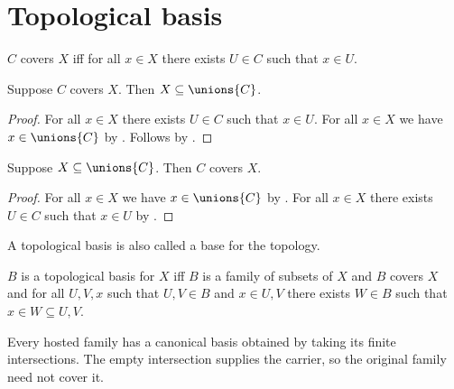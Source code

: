 






\section{Topological basis}\label{form_sec_topobasis}

\begin{abbreviation}\label{covers}
    $C$ covers $X$ iff
    for all $x\in X$ there exists $U\in C$ such that $x\in U$.
\end{abbreviation}

\begin{proposition}\label{covers_unions_intro}
    Suppose $C$ covers $X$.
    Then $X\subseteq\unions{C}$.
\end{proposition}
\begin{proof}
    For all $x\in X$ there exists $U\in C$ such that $x\in U$.
    For all $x\in X$ we have $x\in\unions{C}$ by .
    Follows by .
\end{proof}

\begin{proposition}\label{covers_unions_elim}
    Suppose $X\subseteq\unions{C}$.
    Then $C$ covers $X$.
\end{proposition}
\begin{proof}
    For all $x\in X$ we have $x\in\unions{C}$ by .
    For all $x\in X$ there exists $U\in C$ such that $x\in U$
        by .
\end{proof}

A topological basis is also called a base for the topology.

\begin{definition}\label{topological_basis}
    $B$ is a topological basis for $X$ iff
    $B$ is a family of subsets of $X$ and $B$ covers $X$ and
    for all $U, V, x$ such that $U, V\in B$ and $x\in U,V$
    there exists $W\in B$ such that $x\in W\subseteq U, V$.
\end{definition}

Every hosted family has a canonical basis obtained by taking its finite
intersections.  The empty intersection supplies the carrier, so the original
family need not cover it.

